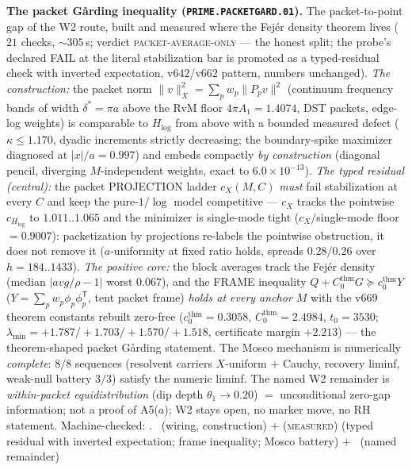 \par\smallskip\noindent\textbf{The packet G\aa rding inequality
(\texttt{PRIME.PACKETGARD.01}).}
The packet-to-point gap of the W2 route, built and measured where
the Fej\'er density theorem lives ($21$ checks, ${\sim}305$\,s;
verdict \textsc{packet-average-only} --- the honest split; the
probe's declared FAIL at the literal stabilization bar is promoted
as a typed-residual check with inverted expectation, v642/v662
pattern, numbers unchanged).  \emph{The construction:} the packet
norm $\|v\|_X^2=\sum_p w_p\|P_p v\|^2$ (continuum frequency bands of
width $\delta^*=\pi a$ above the RvM floor $4\pi A_1=1.4074$, DST
packets, edge-log weights) is comparable to $H_{\log}$ from above
with a bounded measured defect ($\kappa\le1.170$, dyadic increments
strictly decreasing; the boundary-spike maximizer diagnosed at
$|x|/a=0.997$) and embeds compactly \emph{by construction} (diagonal
pencil, diverging $M$-independent weights, exact to
$6.0\times10^{-13}$).  \emph{The typed residual (central):} the
packet PROJECTION ladder $c_X(M,C)$ \emph{must} fail stabilization
at every $C$ and keep the pure-$1/\log$ model competitive --- $c_X$
tracks the pointwise $c_{H_{\log}}$ to $1.011..1.065$ and the
minimizer is single-mode tight ($c_X/$single-mode floor $=0.9007$):
packetization by projections re-labels the pointwise obstruction, it
does not remove it ($a$-uniformity at fixed ratio holds, spreads
$0.28/0.26$ over $h=184..1433$).  \emph{The positive core:} the
block averages track the Fej\'er density (median $|avg/\rho-1|$
worst $0.067$), and the FRAME inequality
$Q+C_0^{\mathrm{thm}}G\succeq c_0^{\mathrm{thm}}Y$
($Y=\sum_p w_p\phi_p\phi_p^{\mathsf T}$, tent packet frame)
\emph{holds at every anchor $M$} with the v669 theorem constants
rebuilt zero-free ($c_0^{\mathrm{thm}}=0.3058$,
$C_0^{\mathrm{thm}}=2.4984$, $t_0=3530$;
$\lambda_{\min}=+1.787/+1.703/+1.570/+1.518$, certificate margin
$+2.213$) --- the theorem-shaped packet G\aa rding statement.  The
Mosco mechanism is numerically \emph{complete}: $8/8$ sequences
(resolvent carriers $X$-uniform $+$ Cauchy, recovery liminf,
weak-null battery $3/3$) satisfy the numeric liminf.  The named W2
remainder is \emph{within-packet equidistribution} (dip depth
$\theta_1\to0.20$) $=$ unconditional zero-gap information; not a
proof of A5($a$); W2 stays open, no marker move, no RH statement.
Machine-checked: .
\mE\ (wiring, construction) $+$ (\textsc{measured}) (typed residual
with inverted expectation; frame inequality; Mosco battery) $+$
\mC\ (named remainder)
\par\smallskip


